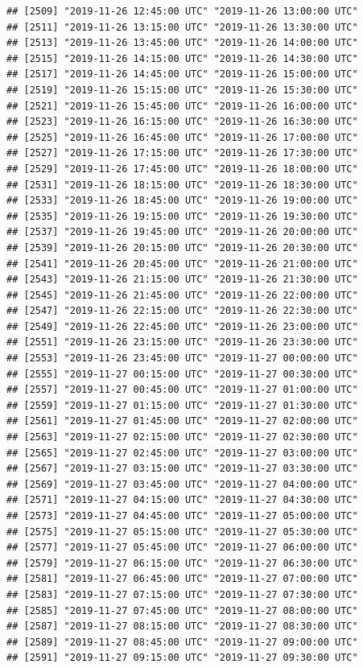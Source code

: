 \documentclass{article}\usepackage[]{graphicx}\usepackage[]{color}
\makeatletter
\newenvironment{kframe}{%
 \def\at@end@of@kframe{}%
 \ifinner\ifhmode%
  \def\at@end@of@kframe{\end{minipage}}%
  \begin{minipage}{\columnwidth}%
 \fi\fi%
 \def\FrameCommand##1{\hskip\@totalleftmargin \hskip-\fboxsep
 \colorbox{shadecolor}{##1}\hskip-\fboxsep
     \hskip-\linewidth \hskip-\@totalleftmargin \hskip\columnwidth}%
 \MakeFramed {\advance\hsize-\width
   \@totalleftmargin\z@ \linewidth\hsize
   \@setminipage}}%
 {\par\unskip\endMakeFramed%
 \at@end@of@kframe}
\newenvironment{knitrout}{}{} %
\makeatother
\begin{document}
\begin{knitrout}
\begin{kframe}
\begin{verbatim}
## [2509] "2019-11-26 12:45:00 UTC" "2019-11-26 13:00:00 UTC"
## [2511] "2019-11-26 13:15:00 UTC" "2019-11-26 13:30:00 UTC"
## [2513] "2019-11-26 13:45:00 UTC" "2019-11-26 14:00:00 UTC"
## [2515] "2019-11-26 14:15:00 UTC" "2019-11-26 14:30:00 UTC"
## [2517] "2019-11-26 14:45:00 UTC" "2019-11-26 15:00:00 UTC"
## [2519] "2019-11-26 15:15:00 UTC" "2019-11-26 15:30:00 UTC"
## [2521] "2019-11-26 15:45:00 UTC" "2019-11-26 16:00:00 UTC"
## [2523] "2019-11-26 16:15:00 UTC" "2019-11-26 16:30:00 UTC"
## [2525] "2019-11-26 16:45:00 UTC" "2019-11-26 17:00:00 UTC"
## [2527] "2019-11-26 17:15:00 UTC" "2019-11-26 17:30:00 UTC"
## [2529] "2019-11-26 17:45:00 UTC" "2019-11-26 18:00:00 UTC"
## [2531] "2019-11-26 18:15:00 UTC" "2019-11-26 18:30:00 UTC"
## [2533] "2019-11-26 18:45:00 UTC" "2019-11-26 19:00:00 UTC"
## [2535] "2019-11-26 19:15:00 UTC" "2019-11-26 19:30:00 UTC"
## [2537] "2019-11-26 19:45:00 UTC" "2019-11-26 20:00:00 UTC"
## [2539] "2019-11-26 20:15:00 UTC" "2019-11-26 20:30:00 UTC"
## [2541] "2019-11-26 20:45:00 UTC" "2019-11-26 21:00:00 UTC"
## [2543] "2019-11-26 21:15:00 UTC" "2019-11-26 21:30:00 UTC"
## [2545] "2019-11-26 21:45:00 UTC" "2019-11-26 22:00:00 UTC"
## [2547] "2019-11-26 22:15:00 UTC" "2019-11-26 22:30:00 UTC"
## [2549] "2019-11-26 22:45:00 UTC" "2019-11-26 23:00:00 UTC"
## [2551] "2019-11-26 23:15:00 UTC" "2019-11-26 23:30:00 UTC"
## [2553] "2019-11-26 23:45:00 UTC" "2019-11-27 00:00:00 UTC"
## [2555] "2019-11-27 00:15:00 UTC" "2019-11-27 00:30:00 UTC"
## [2557] "2019-11-27 00:45:00 UTC" "2019-11-27 01:00:00 UTC"
## [2559] "2019-11-27 01:15:00 UTC" "2019-11-27 01:30:00 UTC"
## [2561] "2019-11-27 01:45:00 UTC" "2019-11-27 02:00:00 UTC"
## [2563] "2019-11-27 02:15:00 UTC" "2019-11-27 02:30:00 UTC"
## [2565] "2019-11-27 02:45:00 UTC" "2019-11-27 03:00:00 UTC"
## [2567] "2019-11-27 03:15:00 UTC" "2019-11-27 03:30:00 UTC"
## [2569] "2019-11-27 03:45:00 UTC" "2019-11-27 04:00:00 UTC"
## [2571] "2019-11-27 04:15:00 UTC" "2019-11-27 04:30:00 UTC"
## [2573] "2019-11-27 04:45:00 UTC" "2019-11-27 05:00:00 UTC"
## [2575] "2019-11-27 05:15:00 UTC" "2019-11-27 05:30:00 UTC"
## [2577] "2019-11-27 05:45:00 UTC" "2019-11-27 06:00:00 UTC"
## [2579] "2019-11-27 06:15:00 UTC" "2019-11-27 06:30:00 UTC"
## [2581] "2019-11-27 06:45:00 UTC" "2019-11-27 07:00:00 UTC"
## [2583] "2019-11-27 07:15:00 UTC" "2019-11-27 07:30:00 UTC"
## [2585] "2019-11-27 07:45:00 UTC" "2019-11-27 08:00:00 UTC"
## [2587] "2019-11-27 08:15:00 UTC" "2019-11-27 08:30:00 UTC"
## [2589] "2019-11-27 08:45:00 UTC" "2019-11-27 09:00:00 UTC"
## [2591] "2019-11-27 09:15:00 UTC" "2019-11-27 09:30:00 UTC"

\end{verbatim}
\end{kframe}
\end{knitrout}
\end{document}
